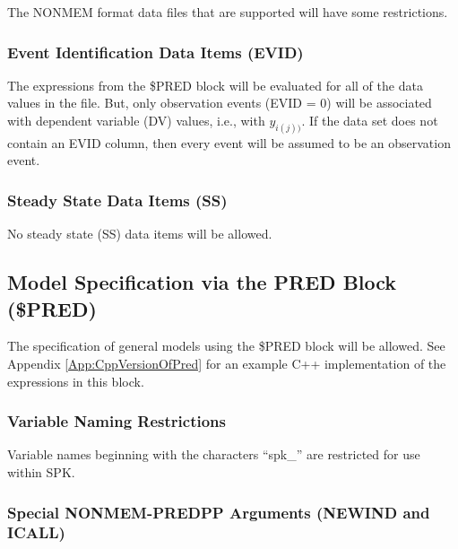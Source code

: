 \documentclass{article}
\begin{document}
The NONMEM format data files that are supported will have some 
restrictions.


\subsubsection{Event Identification Data Items (EVID)}

The expressions from the \$PRED block will be evaluated for all
of the data values in the file.
But, only observation events (EVID = 0) will be associated
with dependent variable (DV) values, i.e., with $y_{i(j))}$.
If the data set does not contain an EVID column, then every
event will be assumed to be an observation event.


\subsubsection{Steady State Data Items (SS)}

No steady state (SS) data items will be allowed.


\subsection{Model Specification via the PRED Block (\$PRED)}

The specification of general models using the \$PRED block will
be allowed.
See Appendix \ref{App:CppVersionOfPred} for an example C++ 
implementation of the expressions in this block.


\subsubsection{Variable Naming Restrictions}

Variable names beginning with the characters ``spk\_'' are restricted
for use within SPK.


\subsubsection{Special NONMEM-PREDPP Arguments (NEWIND and ICALL)}
\end{document}
